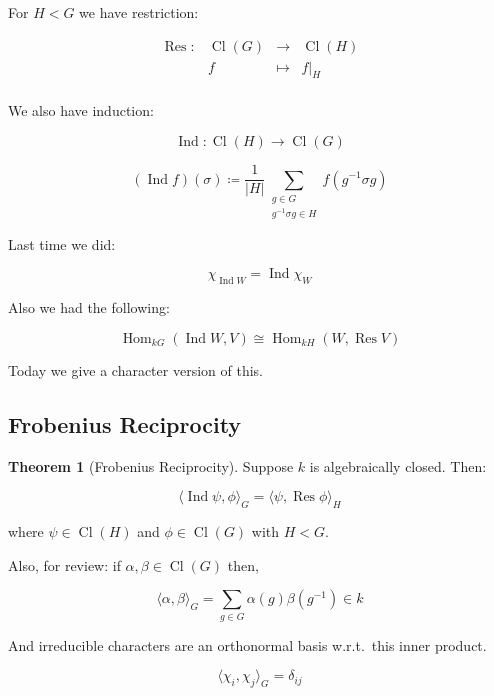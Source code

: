 \documentclass{article}
\theoremstyle{definition}
\newtheorem{theorem}{Theorem}
\begin{document}
For \(H < G\) we have restriction:

\[
    \begin{array}{cccc}
        \operatorname{R es}: & \operatorname{Cl}(G) & \to &  \operatorname{Cl}(H) \\
         & f & \mapsto &  f | _ H \\
    \end{array}
\]

We also have induction:

\[
    \operatorname{Ind} : \operatorname{Cl}(H) \to \operatorname{Cl}(G)
\]

\[
    (\operatorname{Ind} f)(\sigma) \coloneqq \frac{1}{\vert H \vert} \sum_{\substack{g\in G \\ g ^{-1} \sigma g \in H}} f(g ^{-1} \sigma g)
\]

Last time we did:

\[
    \chi_{\operatorname{Ind} W} = \operatorname{Ind} \chi_W
\]

Also we had the following:

\[
    \operatorname{Hom}_{kG} (\operatorname{Ind} W, V) \cong \operatorname{Hom}_{kH}(W, \operatorname{R es} V)
\]

Today we give a character version of this.

\subsection*{Frobenius Reciprocity}

\begin{theorem}
    [Frobenius Reciprocity]

    Suppose \(k\) is algebraically closed. Then:

    \[
        \langle \operatorname{Ind} \psi , \phi \rangle _ G = \langle \psi , \operatorname{R es} \phi \rangle _H 
    \]

    where \(\psi \in \operatorname{Cl} (H)\) and \(\phi \in \operatorname{Cl}(G)\) with \(H < G\).

    Also, for review: if \(\alpha ,\beta \in \operatorname{Cl}(G)\) then,

    \[
        \langle \alpha , \beta \rangle _G = \sum_{g\in G} \alpha(g) \beta(g ^{-1}) \in k
    \]

    And irreducible characters are an orthonormal basis w.r.t.\ this inner product.
    
    \[
        \langle \chi_i, \chi_j \rangle _ G = \delta _{ij}
    \]
\end{theorem}
\end{document}
